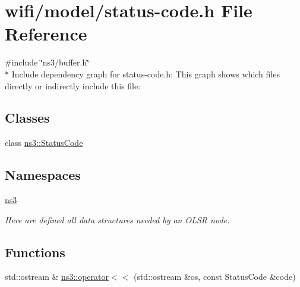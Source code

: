 \hypertarget{status-code_8h}{}\section{wifi/model/status-\/code.h File Reference}
\label{status-code_8h}
{\ttfamily \#include \char`\"{}ns3/buffer.\+h\char`\"{}}\\*
Include dependency graph for status-\/code.h\+:
This graph shows which files directly or indirectly include this file\+:
\subsection*{Classes}
\begin{DoxyCompactItemize}
\item 
class \hyperlink{classns3_1_1StatusCode}{ns3\+::\+Status\+Code}
\end{DoxyCompactItemize}
\subsection*{Namespaces}
\begin{DoxyCompactItemize}
\item 
 \hyperlink{namespacens3}{ns3}
\begin{DoxyCompactList}\small\item\em Here are defined all data structures needed by an O\+L\+SR node. \end{DoxyCompactList}\end{DoxyCompactItemize}
\subsection*{Functions}
\begin{DoxyCompactItemize}
\item 
std\+::ostream \& \hyperlink{namespacens3_ae66e05fb0310369670cbe866a045c962}{ns3\+::operator$<$$<$} (std\+::ostream \&os, const Status\+Code \&code)
\end{DoxyCompactItemize}
